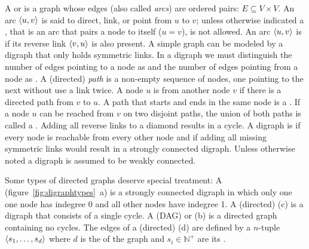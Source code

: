 A  or  is a graph whose edges (also called
\textit{arcs}) are ordered pairs: $E \subseteq V \times V$. An arc $\langle u,v \rangle$
is said to direct, link, or point from $u$ to $v$; unless otherwise indicated a
, that is an arc that pairs a node to itself ($u=v$), is not allowed.
An arc $\langle u,v \rangle$ is  if its reverse link $\langle v,u \rangle$ is
also present. A simple graph can be modeled by a digraph that only holds
symmetric links. In a digraph we must distinguish the number of edges pointing
to a node as  and the number of edges pointing from a node as
. A (directed) \textit{path} is a non-empty sequence
of nodes, one pointing to the next without use a link twice. A node $u$ is
 from another node $v$ if there is a directed path from $v$ to
$u$. A path that starts and ends in the same node is a \textit{}.
If a node $u$ can be reached from $v$ on two disjoint paths, the union of
both paths is called a . Adding all reverse links to a
diamond results in a cycle. A digraph is  if every node
is reachable from every other node and  if adding all
missing symmetric links would result in a strongly connected digraph. Unless
otherwise noted a digraph is assumed to be weakly connected.

Some types of directed graphs deserve special treatment: A  
(figure~\ref{fig:digraphtypes}~{\ormbf a}) is a strongly connected digraph in
which only one one node has indegree 0 and all other nodes have indegree 1.
A (directed)  ({\ormbf c}) is a digraph that consists of a
single cycle. A 
(DAG) or  ({\ormbf b}) is a directed graph containing no
cycles. 
The edges of a (directed)  ({\ormbf d}) are defined by a
$n$-tuple $\langle s_1,\ldots,s_d \rangle$ where $d$ is the  of the graph and $s_i \in \mathbb{N}^+$ are its
.



